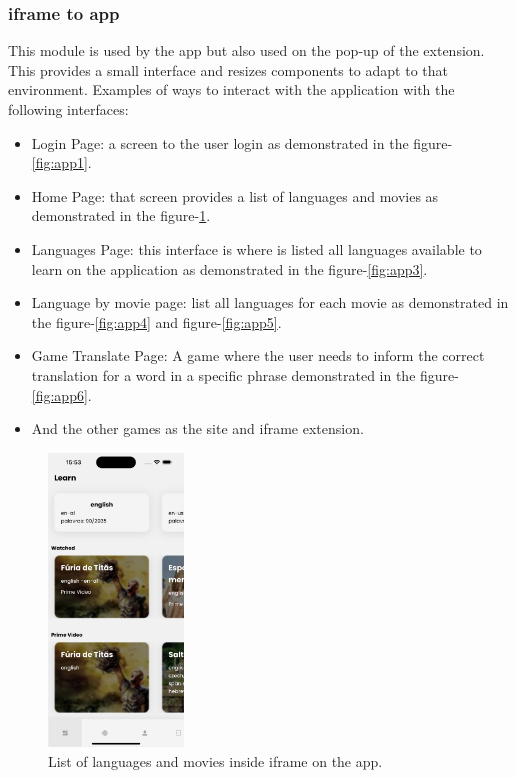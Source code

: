 \documentclass[12pt]{article}
\begin{document}
\subsubsection{iframe to app}
This module is used by the app but also used on the pop-up of the extension. This provides a small interface and resizes components to adapt to that environment. Examples of ways to interact with the application with the following interfaces:
\begin{itemize}
  \item Login Page: a screen to the user login as demonstrated in the figure-\ref{fig:app1}.
  \item Home Page:  that screen provides a list of languages and movies as demonstrated in the figure-\ref{fig:app2}.
  \item Languages Page: this interface is where is listed all languages available to learn on the application as demonstrated in the figure-\ref{fig:app3}.
  \item Language by movie page: list all languages for each movie as demonstrated in the figure-\ref{fig:app4} and figure-\ref{fig:app5}.
  \item Game Translate Page: A game where the user needs to inform the correct translation for a word in a specific phrase demonstrated in the figure-\ref{fig:app6}.
  \item And the other games as the site and iframe extension. 
  \end{itemize}
  
 \begin{figure}[!h]
    \centering
    \caption{
     List of languages and movies inside iframe on the app.
    }
    \label{fig:app2}
    \includegraphics[width=0.32\textwidth]{assets/15.png}
  \end{figure}
  
\end{document}
